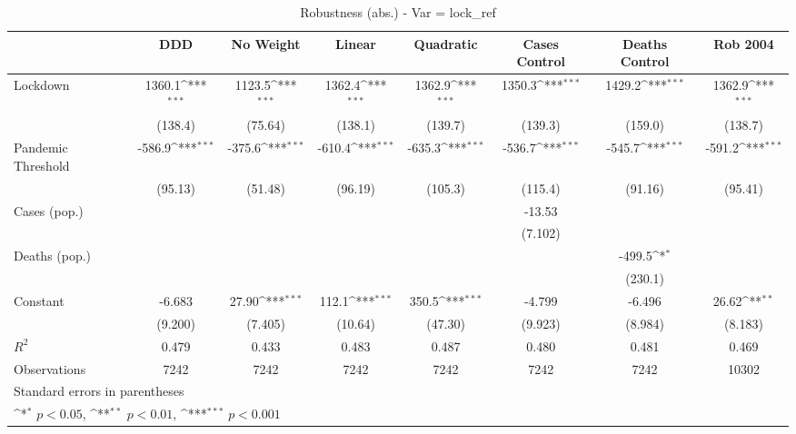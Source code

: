 \documentclass{article}
\begin{document}
{
\def\sym#1{\ifmmode^{#1}\else\(^{#1}\)\fi}
\begin{longtable}{l*{7}{c}}
\caption{Robustness (abs.) - Var = lock\_ref}\\
\hline\hline\endfirsthead\hline\endhead\hline\endfoot\endlastfoot
                &\multicolumn{1}{c}{DDD}&\multicolumn{1}{c}{No Weight}&\multicolumn{1}{c}{Linear}&\multicolumn{1}{c}{Quadratic}&\multicolumn{1}{c}{Cases Control}&\multicolumn{1}{c}{Deaths Control}&\multicolumn{1}{c}{Rob 2004}\\
\hline
Lockdown        &   1360.1\sym{***}&   1123.5\sym{***}&   1362.4\sym{***}&   1362.9\sym{***}&   1350.3\sym{***}&   1429.2\sym{***}&   1362.9\sym{***}\\
                &  (138.4)         &  (75.64)         &  (138.1)         &  (139.7)         &  (139.3)         &  (159.0)         &  (138.7)         \\
Pandemic Threshold&   -586.9\sym{***}&   -375.6\sym{***}&   -610.4\sym{***}&   -635.3\sym{***}&   -536.7\sym{***}&   -545.7\sym{***}&   -591.2\sym{***}\\
                &  (95.13)         &  (51.48)         &  (96.19)         &  (105.3)         &  (115.4)         &  (91.16)         &  (95.41)         \\
Cases (pop.)    &                  &                  &                  &                  &   -13.53         &                  &                  \\
                &                  &                  &                  &                  &  (7.102)         &                  &                  \\
Deaths (pop.)   &                  &                  &                  &                  &                  &   -499.5\sym{*}  &                  \\
                &                  &                  &                  &                  &                  &  (230.1)         &                  \\
Constant        &   -6.683         &    27.90\sym{***}&    112.1\sym{***}&    350.5\sym{***}&   -4.799         &   -6.496         &    26.62\sym{**} \\
                &  (9.200)         &  (7.405)         &  (10.64)         &  (47.30)         &  (9.923)         &  (8.984)         &  (8.183)         \\
\hline
\(R^{2}\)       &    0.479         &    0.433         &    0.483         &    0.487         &    0.480         &    0.481         &    0.469         \\
Observations    &     7242         &     7242         &     7242         &     7242         &     7242         &     7242         &    10302         \\
\hline\hline
\multicolumn{8}{l}{\footnotesize Standard errors in parentheses}\\
\multicolumn{8}{l}{\footnotesize \sym{*} \(p<0.05\), \sym{**} \(p<0.01\), \sym{***} \(p<0.001\)}\\
\end{longtable}
}
\end{document}
